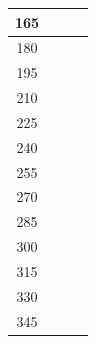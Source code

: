\documentclass[twocolumn,a4j]{jsarticle}
\begin{document}
\begin{table}[htbp]
\begin{center}
\begin{tabular}{|p{20mm}|p{20mm}|p{20mm}|p{20mm}|}
            \multicolumn{1}{|c|}{165}                & \multicolumn{1}{|r|}{}           & \multicolumn{1}{|r|}{\textgt{}}  & \multicolumn{1}{|r|}{\textgt{}}  \\ \hline
            \multicolumn{1}{|c|}{180}                & \multicolumn{1}{|r|}{}           & \multicolumn{1}{|r|}{\textgt{}}  & \multicolumn{1}{|r|}{\textgt{}}  \\ \hline
            \multicolumn{1}{|c|}{195}                & \multicolumn{1}{|r|}{}           & \multicolumn{1}{|r|}{\textgt{}}  & \multicolumn{1}{|r|}{\textgt{}}  \\ \hline
            \multicolumn{1}{|c|}{210}                & \multicolumn{1}{|r|}{}           & \multicolumn{1}{|r|}{\textgt{}}  & \multicolumn{1}{|r|}{\textgt{}}  \\ \hline
            \multicolumn{1}{|c|}{225}                & \multicolumn{1}{|r|}{}           & \multicolumn{1}{|r|}{\textgt{}}  & \multicolumn{1}{|r|}{\textgt{}}  \\ \hline
            \multicolumn{1}{|c|}{240}              & \multicolumn{1}{|r|}{}           & \multicolumn{1}{|r|}{\textgt{}}  & \multicolumn{1}{|r|}{\textgt{}}  \\ \hline
            \multicolumn{1}{|c|}{255}              & \multicolumn{1}{|r|}{}           & \multicolumn{1}{|r|}{\textgt{}}  & \multicolumn{1}{|r|}{\textgt{}}  \\ \hline
            \multicolumn{1}{|c|}{270}              & \multicolumn{1}{|r|}{}           & \multicolumn{1}{|r|}{\textgt{}}  & \multicolumn{1}{|r|}{\textgt{}}  \\ \hline
            \multicolumn{1}{|c|}{285}              & \multicolumn{1}{|r|}{}           & \multicolumn{1}{|r|}{\textgt{}}  & \multicolumn{1}{|r|}{\textgt{}}  \\ \hline
            \multicolumn{1}{|c|}{300}              & \multicolumn{1}{|r|}{}           & \multicolumn{1}{|r|}{\textgt{}}  & \multicolumn{1}{|r|}{\textgt{}}  \\ \hline
            \multicolumn{1}{|c|}{315}              & \multicolumn{1}{|r|}{}           & \multicolumn{1}{|r|}{\textgt{}}  & \multicolumn{1}{|r|}{\textgt{}}  \\ \hline
            \multicolumn{1}{|c|}{330}              & \multicolumn{1}{|r|}{}           & \multicolumn{1}{|r|}{\textgt{}}  & \multicolumn{1}{|r|}{\textgt{}}  \\ \hline
            \multicolumn{1}{|c|}{345}              & \multicolumn{1}{|r|}{}           & \multicolumn{1}{|r|}{\textgt{}}  & \multicolumn{1}{|r|}{\textgt{}}  \\ \hline
        \end{tabular}
    \end{center}
\end{table}
\newpage
\end{document}
